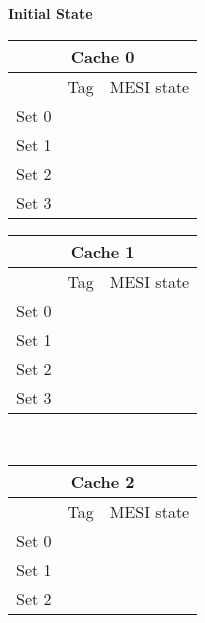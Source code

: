 \begin{center} 
\newpage
\textbf{Initial State}
\\ \vspace{3mm}
\begin{tabular}{|ccc|}
\hline
\multicolumn{3}{|c|}{\textbf{Cache 0}}                                   \\ \hline
\multicolumn{1}{|c|}{}      & \multicolumn{1}{c|}{Tag}      & MESI state \\ \hline
\multicolumn{1}{|c|}{Set 0} & \multicolumn{1}{c|}{} &            \\ \hline
\multicolumn{1}{|c|}{Set 1} & \multicolumn{1}{c|}{} &            \\ \hline
\multicolumn{1}{|c|}{Set 2} & \multicolumn{1}{c|}{} &            \\ \hline
\multicolumn{1}{|c|}{Set 3} & \multicolumn{1}{c|}{} &            \\ \hline
\end{tabular}
\begin{tabular}{|ccc|}
\hline
\multicolumn{3}{|c|}{\textbf{Cache 1}}                                   \\ \hline
\multicolumn{1}{|c|}{}      & \multicolumn{1}{c|}{Tag}      & MESI state \\ \hline
\multicolumn{1}{|c|}{Set 0} & \multicolumn{1}{c|}{} &            \\ \hline
\multicolumn{1}{|c|}{Set 1} & \multicolumn{1}{c|}{} &            \\ \hline
\multicolumn{1}{|c|}{Set 2} & \multicolumn{1}{c|}{} &            \\ \hline
\multicolumn{1}{|c|}{Set 3} & \multicolumn{1}{c|}{} &            \\ \hline
\end{tabular}
\\ \vspace{1mm}
\begin{tabular}{|ccc|}
\hline
\multicolumn{3}{|c|}{\textbf{Cache 2}}                                   \\ \hline
\multicolumn{1}{|c|}{}      & \multicolumn{1}{c|}{Tag}      & MESI state \\ \hline
\multicolumn{1}{|c|}{Set 0} & \multicolumn{1}{c|}{} &            \\ \hline
\multicolumn{1}{|c|}{Set 1} & \multicolumn{1}{c|}{} &            \\ \hline
\multicolumn{1}{|c|}{Set 2} & \multicolumn{1}{c|}{} &            \\ \hline

\end{tabular}
\end{center}
